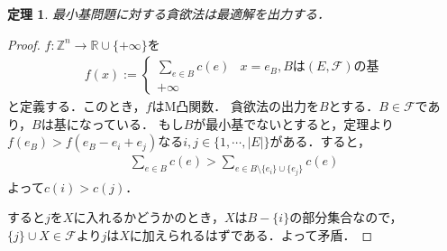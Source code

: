 \documentclass[uplatex]{jsarticle}
\newcommand{\abs}[1]{ \left| #1 \right| }
\newcommand{\Int}{\mathbb{Z}}
\theoremstyle{break}
\newtheorem{theo}{定理}[section]
\newtheorem{proof}{証明}[section]
\begin{document}
\begin{theo}
  最小基問題に対する貪欲法は最適解を出力する．
\end{theo}
\begin{proof}
  $f\colon\Int^n \to \mathbb{R}\cup \{+\infty\}$を
  \begin{align*}
    f(x) := \begin{cases}
      \sum_{e\in B}c(e) & x=e_B,Bは(E,\mathcal{F})の基 \\
      +\infty
    \end{cases}
  \end{align*}
  と定義する．このとき，$f$はM凸関数．
  貪欲法の出力を$B$とする．$B\in \mathcal{F}$であり，$B$は基になっている．
  もし$B$が最小基でないとすると，定理より$f(e_B)>f(e_B-e_i+e_j)$なる$i,j\in \{1,\cdots,\abs{E}\}$がある．すると，
  \begin{align*}
    \sum_{e\in B} c(e) > \sum_{e\in B \setminus \{e_i\}\cup \{e_j\}} c(e)
  \end{align*}
  よって$c(i) > c(j)$．

  すると$j$を$X$に入れるかどうかのとき，$X$は$B-\{i\}$の部分集合なので，$\{j\}\cup X \in \mathcal{F}$より$j$は$X$に加えられるはずである．よって矛盾．
\end{proof}
\end{document}
